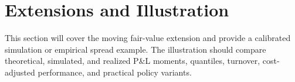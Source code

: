 \section{Extensions and Illustration}

This section will cover the moving fair-value extension and provide a calibrated simulation or empirical spread example. The illustration should compare theoretical, simulated, and realized P\&L moments, quantiles, turnover, cost-adjusted performance, and practical policy variants.
